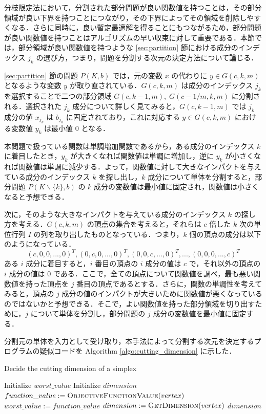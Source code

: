 \documentclass[a4paper,11pt]{jreport}
\begin{document}
分枝限定法において，分割された部分問題が良い関数値を持つことは，その部分領域が良い下界を持つことにつながり，その下界によってその領域を削除しやすくなる．さらに同時に，良い暫定最適解を得ることにもつながるため，部分問題が良い関数値を持つことはアルゴリズムの早い収束に対して重要である．本節では，部分領域が良い関数値を持つような \ref{sec:partition} 節における成分のインデックス $ j_k $ の選び方，つまり，問題を分割する次元の決定方法について論じる．\par
\ref{sec:partition} 節の問題 $ P(K, b) $ では，元の変数 $ x $ の代わりに $ y \in G(c, k, m) $ となるような変数 $ y $ が取り直されている．$ G(c, k, m) $ は成分のインデックス $ j_k $ を選択することで二つの部分領域 $ G(c, k-1, m), \; G(c-1/m, k, m) $ に分割される．選択された $ j_k $ 成分について詳しく見てみると，$ G(c, k - 1, m) $ では $ j_k $ 成分の値 $ x_{j_k} $ は $ b_{j_k} $ に固定されており，これに対応する $ y \in G(c, k, m) $ における変数値 $ y_k $ は最小値 $ 0 $ となる．\par
本問題で扱っている関数は単調増加関数であるから，ある成分のインデックス $ k $ に着目したとき，$ y_k $ が大きくなれば関数値は単調に増加し，逆に $ y_k $ が小さくなれば関数値は単調に減少する．よって，関数値に対して大きなインパクトを与えている成分のインデックス $ k $ を探し出し，$ k $ 成分について単体を分割すると，部分問題 $ P(K \backslash \{ k \}, b) $ の $ k $ 成分の変数値は最小値に固定され，関数値は小さくなると予想できる．\par
次に，そのような大きなインパクトを与えている成分のインデックス $ k $ の探し方を考える．$ G(c, k, m) $ の頂点の集合を考えると，それらは $ c $ 倍した $ k $ 次の単位行列 $ I $ の列を取り出したものとなっている．つまり，$ k $ 個の頂点の成分は以下のようになっている．
$$ (c, 0, 0, ..., 0)^T, (0, c, 0, ..., 0)^T, (0, 0, c, ..., 0)^T, ..., (0, 0, 0, ..., c)^T $$
ある $ i $ 成分に着目すると，$ i $ 番目の頂点の $ i $ 成分の値は $ c $ で，それ以外の頂点の $ i $ 成分の値は $ 0 $ である．ここで，全ての頂点について関数値を調べ，最も悪い関数値を持った頂点を $ j $ 番目の頂点であるとする．さらに，関数の単調性を考えてみると，頂点の $ j $ 成分の値のインパクトが大きいために関数値が悪くなっているのではないかと予想できる．そこで，よい関数値を持った部分領域を切り出すために，$ j $ について単体を分割し，部分問題の $ j $ 成分の変数値を最小値に固定する．\par
分割元の単体を入力として受け取り，本手法によって分割する次元を決定するプログラムの疑似コードを Algorithm \ref{algo:cutting_dimension} に示した．\par

\begin{algorithm}
\caption{Decide the cutting dimension of a simplex}
\label{algo:cutting_dimension}
\begin{algorithmic}[1]
\State Initialize $ worst\_value $
\State Initialize $ dimension $
\State $ function\_value := \Call{ObjectiveFunctionValue}{vertex} $
\State $ worst\_value := function\_value $
\State $ dimension := \Call{GetDimension}{vertex} $
\EndIf
\EndFor
\State \Return $ dimension $
\EndFunction
\end{algorithmic}
\end{algorithm}
\end{document}
